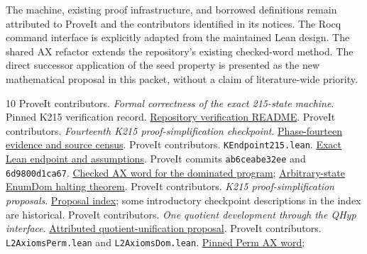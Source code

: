 \documentclass[11pt,letterpaper]{article}
\theoremstyle{definition}\newtheorem{definition}[theorem]{Definition}
\newcommand{\code}[1]{\texttt{#1}}
\begin{document}
The machine, existing proof infrastructure, and borrowed definitions remain
attributed to ProveIt and the contributors identified in its notices. The Rocq
command interface is explicitly adapted from the maintained Lean design. The
shared AX refactor extends the repository's existing checked-word method. The
direct successor application of the seed property is presented as the new
mathematical proposal in this packet, without a claim of literature-wide priority.

\begin{thebibliography}{10}\small
{} ProveIt contributors. \emph{Formal correctness of the exact
215-state machine}. Pinned K215 verification record.
\href{https://github.com/VladimirReshetnikov/ProveIt/blob/6d9800d1ca67c52db0eb6e1c65df7b5cab9cdb95/Computability/BusyBeaver/Research/ZFC/k225-formal/verification/k215/README.md}{Repository verification README}.
 ProveIt contributors. \emph{Fourteenth K215 proof-simplification
checkpoint}. \href{https://github.com/VladimirReshetnikov/ProveIt/blob/6d9800d1ca67c52db0eb6e1c65df7b5cab9cdb95/Computability/BusyBeaver/Research/ZFC/k225-formal/verification/k215/simplification/phase14/README.md}{Phase-fourteen evidence and source census}.
 ProveIt contributors. \code{KEndpoint215.lean}.
\href{https://github.com/VladimirReshetnikov/ProveIt/blob/6d9800d1ca67c52db0eb6e1c65df7b5cab9cdb95/Computability/BusyBeaver/Lean/BusyBeaver/ZFC/KEndpoint215.lean}{Exact Lean endpoint and assumptions}.
 ProveIt commits \code{ab6ceabe32ee} and \code{6d9800d1ca67}.
\href{https://github.com/VladimirReshetnikov/ProveIt/commit/ab6ceabe32eefb196d81154d0cb3a811ed9a38a1}{Checked AX word for the dominated program};
\href{https://github.com/VladimirReshetnikov/ProveIt/commit/6d9800d1ca67c52db0eb6e1c65df7b5cab9cdb95}{Arbitrary-state EnumDom halting theorem}.
 ProveIt contributors. \emph{K215 proof-simplification proposals}.
\href{https://github.com/VladimirReshetnikov/ProveIt/blob/6d9800d1ca67c52db0eb6e1c65df7b5cab9cdb95/Computability/BusyBeaver/Research/ZFC/k225-formal/verification/k215/simplification/proposals/README.md}{Proposal index}; some introductory checkpoint descriptions in the index are historical.
 ProveIt contributors. \emph{One quotient development through the
QHyp interface}. \href{https://github.com/VladimirReshetnikov/ProveIt/commit/eb931b07ad8de83ba1a1d21dc84abe5a1c98364e}{Attributed quotient-unification proposal}.
 ProveIt contributors. \code{L2AxiomsPerm.lean} and
\code{L2AxiomsDom.lean}. \href{https://github.com/VladimirReshetnikov/ProveIt/blob/6d9800d1ca67c52db0eb6e1c65df7b5cab9cdb95/Computability/BusyBeaver/Lean/BusyBeaver/ZFC/L2AxiomsPerm.lean}{Pinned Perm AX word};

\end{thebibliography}
\end{document}
